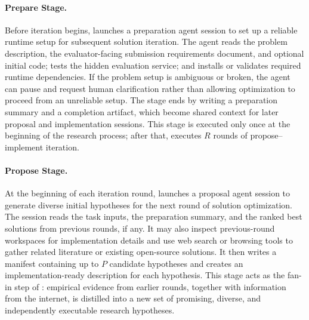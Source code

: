 \documentclass{article} %
\begin{document}
   
   \paragraph{Prepare Stage.}
   Before iteration begins, \method launches a preparation agent session to set up a reliable runtime setup for subsequent solution iteration.
   The agent reads the problem description, the evaluator-facing submission requirements document, and optional initial code; tests the
   hidden evaluation service; and installs or validates required runtime dependencies. If the problem setup is ambiguous or broken, the
   agent can pause and request human clarification rather than allowing optimization to proceed from an unreliable setup. The stage ends
   by writing a preparation summary and a completion artifact, which become shared context for later proposal and implementation sessions.
   This stage is executed only once at the beginning of the research process; after that, \method executes \(R\) rounds of
   propose--implement iteration.
   
   \paragraph{Propose Stage.}
   At the beginning of each iteration round, \method launches a proposal agent session to generate diverse initial hypotheses for the next round of solution
   optimization. The session reads the task inputs, the preparation summary, and the ranked best solutions from previous rounds, if any. It
   may also inspect previous-round workspaces for implementation details and use web search or browsing tools to gather related literature or existing open-source solutions. It then writes a manifest containing up to \(P\) candidate hypotheses
   and creates an implementation-ready description for each hypothesis. This stage acts as the fan-in step of \method: empirical evidence
   from earlier rounds, together with information from the internet, is distilled into a new set of promising, diverse, and independently
   executable research hypotheses.
   
\end{document}
